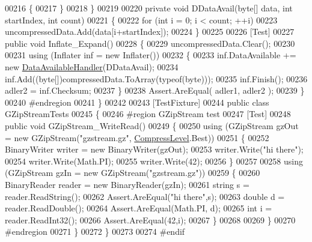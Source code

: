 \begin{DoxyCode}
00216             \{
00217             \}
00218         \}
00219 
00220         \textcolor{keyword}{private} \textcolor{keywordtype}{void} DDataAvail(byte[] data, \textcolor{keywordtype}{int} startIndex, \textcolor{keywordtype}{int} count)
00221         \{
00222             \textcolor{keywordflow}{for} (\textcolor{keywordtype}{int} i = 0; i < count; ++i)
00223                 uncompressedData.Add(data[i+startIndex]);
00224         \}
00225 
00226         [Test]
00227         \textcolor{keyword}{public} \textcolor{keywordtype}{void} Inflate\_Expand()
00228         \{
00229             uncompressedData.Clear();
00230 
00231             \textcolor{keyword}{using} (Inflater inf = \textcolor{keyword}{new} Inflater())
00232             \{
00233                 inf.DataAvailable += \textcolor{keyword}{new} \hyperlink{namespace_dot_z_lib_a13a751b897fc2af0be2307e4deb7eb1c}{DataAvailableHandler}(DDataAvail);
00234                 inf.Add((byte[])compressedData.ToArray(typeof(byte)));
00235                 inf.Finish();
00236                 adler2 = inf.Checksum;
00237             \}
00238             Assert.AreEqual( adler1, adler2 );
00239         \}
00240 \textcolor{preprocessor}{        #endregion}
00241     \}
00242 
00243     [TestFixture]
00244     \textcolor{keyword}{public} \textcolor{keyword}{class }GZipStreamTests
00245     \{
00246 \textcolor{preprocessor}{        #region GZipStream test}
00247         [Test]
00248         \textcolor{keyword}{public} \textcolor{keywordtype}{void} GZipStream\_WriteRead()
00249         \{
00250             \textcolor{keyword}{using} (GZipStream gzOut = \textcolor{keyword}{new} GZipStream(\textcolor{stringliteral}{"gzstream.gz"}, 
      \hyperlink{namespace_dot_z_lib_a034f7a1ef9856d8834e6f6b1c53d8a4c}{CompressLevel}.Best))
00251             \{
00252                 BinaryWriter writer = \textcolor{keyword}{new} BinaryWriter(gzOut);
00253                 writer.Write(\textcolor{stringliteral}{"hi there"});
00254                 writer.Write(Math.PI);
00255                 writer.Write(42);
00256             \}
00257 
00258             \textcolor{keyword}{using} (GZipStream gzIn = \textcolor{keyword}{new} GZipStream(\textcolor{stringliteral}{"gzstream.gz"}))
00259             \{
00260                 BinaryReader reader = \textcolor{keyword}{new} BinaryReader(gzIn);
00261                 \textcolor{keywordtype}{string} s = reader.ReadString();
00262                 Assert.AreEqual(\textcolor{stringliteral}{"hi there"},s);
00263                 \textcolor{keywordtype}{double} d = reader.ReadDouble();
00264                 Assert.AreEqual(Math.PI, d);
00265                 \textcolor{keywordtype}{int} i = reader.ReadInt32();
00266                 Assert.AreEqual(42,i);
00267             \}
00268 
00269         \}
00270 \textcolor{preprocessor}{        #endregion}
00271     \}
00272 \}
00273 
00274 \textcolor{preprocessor}{#endif}
\end{DoxyCode}

